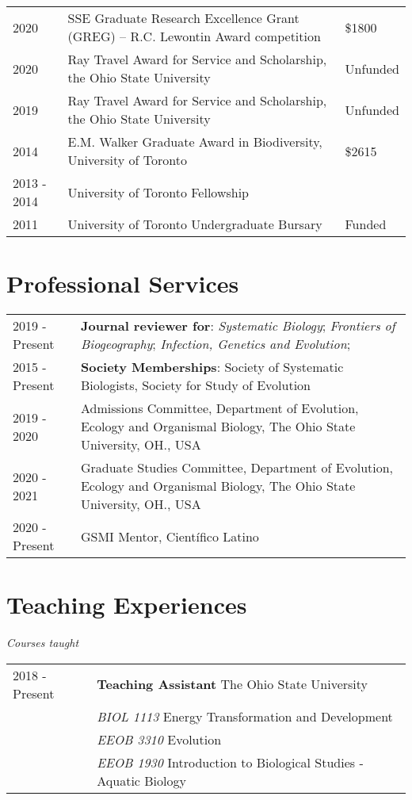 \documentclass[11pt]{article}
\begin{document}
\begin{longtable}{p{}  p{} p{}}

2020 &	SSE Graduate Research Excellence Grant (GREG) – R.C. Lewontin Award competition & \$1800\\
2020 &	Ray Travel Award for Service and Scholarship, the Ohio State University & Unfunded\\
2019 &	Ray Travel Award for Service and Scholarship, the Ohio State University & Unfunded\\
2014 &	E.M. Walker Graduate Award in Biodiversity, University of Toronto & \$2615\\
2013 - 2014 & University of Toronto Fellowship &  \\
2011 &	University of Toronto Undergraduate Bursary & Funded\\

\end{longtable}

\hspace{0pt}
\section*{Professional Services}
\begin{longtable}{p{}  p{}}

2019 - Present &	\textbf{Journal reviewer for}: \textit{Systematic Biology}; \textit{Frontiers of Biogeography}; \textit{Infection, Genetics and Evolution};\\
2015 - Present &  \textbf{Society Memberships}: Society of Systematic Biologists, Society for Study of Evolution\\
2019 - 2020 &	Admissions Committee, Department of Evolution, Ecology and Organismal Biology, The Ohio State University, OH., USA\\
2020 - 2021 &  Graduate Studies Committee, Department of Evolution, Ecology and Organismal Biology, The Ohio State University, OH., USA\\
2020 - Present& GSMI Mentor,  Científico Latino

\end{longtable}

\hspace{0pt}
\section*{Teaching Experiences}
\textit{Courses taught}

\begin{longtable}{p{}  p{}}

2018 - Present & \textbf{Teaching Assistant} The Ohio State University\\
 & \textit{BIOL 1113} Energy Transformation and Development\\
& \textit{EEOB 3310} Evolution\\
& \textit{EEOB 1930} Introduction to Biological Studies - Aquatic Biology\\

\end{longtable}
\end{document}
